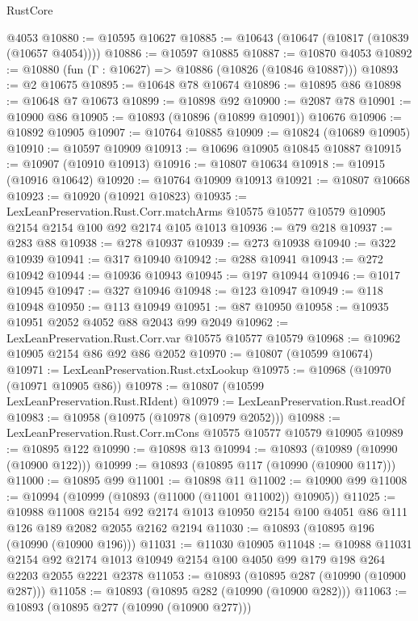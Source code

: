 \begin{lexlean}{RustCore}
\begin{coremodule}
    @4053
@10880 := @10595 @10627
@10885 := @10643 (@10647 (@10817 (@10839 (@10657 @4054))))
@10886 := @10597 @10885
@10887 := @10870 @4053
@10892 := @10880 (fun (Γ : @10627) => @10886 (@10826 (@10846 @10887)))
@10893 := @2 @10675
@10895 := @10648 @78 @10674
@10896 := @10895 @86
@10898 := @10648 @7 @10673
@10899 := @10898 @92
@10900 := @2087 @78
@10901 := @10900 @86
@10905 := @10893 (@10896 (@10899 @10901)) @10676
@10906 := @10892 @10905
@10907 := @10764 @10885
@10909 := @10824 (@10689 @10905)
@10910 := @10597 @10909
@10913 := @10696 @10905 @10845 @10887
@10915 := @10907 (@10910 @10913)
@10916 := @10807 @10634
@10918 := @10915 (@10916 @10642)
@10920 := @10764 @10909 @10913
@10921 := @10807 @10668
@10923 := @10920 (@10921 @10823)
@10935 := LexLeanPreservation.Rust.Corr.matchArms
    @10575
    @10577
    @10579
    @10905
    @2154
    @2154
    @100
    @92
    @2174
    @105
    @1013
@10936 := @79 @218
@10937 := @283 @88
@10938 := @278 @10937
@10939 := @273 @10938
@10940 := @322 @10939
@10941 := @317 @10940
@10942 := @288 @10941
@10943 := @272 @10942
@10944 := @10936 @10943
@10945 := @197 @10944
@10946 := @1017 @10945
@10947 := @327 @10946
@10948 := @123 @10947
@10949 := @118 @10948
@10950 := @113 @10949
@10951 := @87 @10950
@10958 := @10935 @10951 @2052 @4052 @88 @2043 @99 @2049
@10962 := LexLeanPreservation.Rust.Corr.var @10575 @10577 @10579
@10968 := @10962 @10905 @2154 @86 @92 @86 @2052
@10970 := @10807 (@10599 @10674)
@10971 := LexLeanPreservation.Rust.ctxLookup
@10975 := @10968 (@10970 (@10971 @10905 @86))
@10978 := @10807 (@10599 LexLeanPreservation.Rust.RIdent)
@10979 := LexLeanPreservation.Rust.readOf
@10983 := @10958 (@10975 (@10978 (@10979 @2052)))
@10988 := LexLeanPreservation.Rust.Corr.mCons @10575 @10577 @10579 @10905
@10989 := @10895 @122
@10990 := @10898 @13
@10994 := @10893 (@10989 (@10990 (@10900 @122)))
@10999 := @10893 (@10895 @117 (@10990 (@10900 @117)))
@11000 := @10895 @99
@11001 := @10898 @11
@11002 := @10900 @99
@11008 := @10994 (@10999 (@10893 (@11000 (@11001 @11002)) @10905))
@11025 := @10988
    @11008
    @2154
    @92
    @2174
    @1013
    @10950
    @2154
    @100
    @4051
    @86
    @111
    @126
    @189
    @2082
    @2055
    @2162
    @2194
@11030 := @10893 (@10895 @196 (@10990 (@10900 @196)))
@11031 := @11030 @10905
@11048 := @10988
    @11031
    @2154
    @92
    @2174
    @1013
    @10949
    @2154
    @100
    @4050
    @99
    @179
    @198
    @264
    @2203
    @2055
    @2221
    @2378
@11053 := @10893 (@10895 @287 (@10990 (@10900 @287)))
@11058 := @10893 (@10895 @282 (@10990 (@10900 @282)))
@11063 := @10893 (@10895 @277 (@10990 (@10900 @277)))

\end{coremodule}
\end{lexlean}

